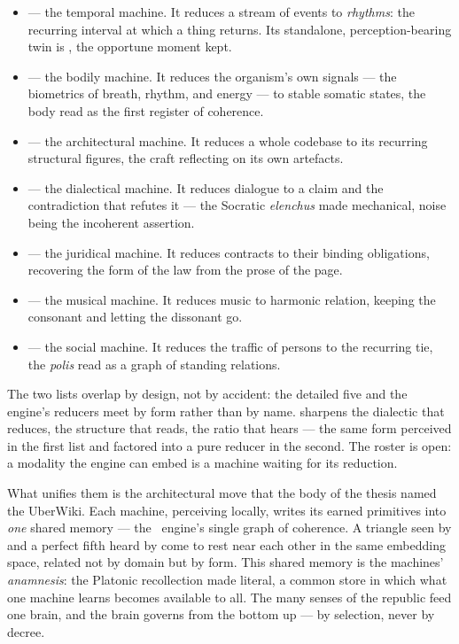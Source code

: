 \begin{itemize}
\item {} --- the temporal machine. It reduces a stream of events to
  \emph{rhythms}: the recurring interval at which a thing returns. Its standalone,
  perception-bearing twin is , the opportune moment kept.
\item {} --- the bodily machine. It reduces the organism's own
  signals --- the biometrics of breath, rhythm, and energy --- to stable somatic
  states, the body read as the first register of coherence.
\item {} --- the architectural machine. It reduces a whole codebase
  to its recurring structural figures, the craft reflecting on its own artefacts.
\item {} --- the dialectical machine. It reduces dialogue to a
  claim and the contradiction that refutes it --- the Socratic \emph{elenchus}
  made mechanical, noise being the incoherent assertion.
\item {} --- the juridical machine. It reduces contracts to their
  binding obligations, recovering the form of the law from the prose of the page.
\item {} --- the musical machine. It reduces music to harmonic
  relation, keeping the consonant and letting the dissonant go.
\item {} --- the social machine. It reduces the traffic of persons to
  the recurring tie, the \emph{polis} read as a graph of standing relations.
\end{itemize}

\noindent The two lists overlap by design, not by accident: the detailed five and
the engine's reducers meet by form rather than by name.  sharpens
the dialectic that  reduces,  the structure that
 reads,  the ratio that 
hears --- the same form perceived in the first list and factored into a pure
reducer in the second. The roster is open: a modality the engine can embed is a
machine waiting for its reduction.

What unifies them is the architectural move that the body of the thesis named the
UberWiki. Each machine, perceiving locally, writes its earned primitives into
\emph{one} shared memory --- the \physis\ engine's single graph of coherence. A
triangle seen by  and a perfect fifth heard by 
come to rest near each other in the same embedding space, related not by domain
but by form. This shared memory is the machines' \emph{anamnesis}: the Platonic
recollection made literal, a common store in which what one machine learns becomes
available to all. The many senses of the republic feed one brain, and the brain
governs from the bottom up --- by selection, never by decree.

